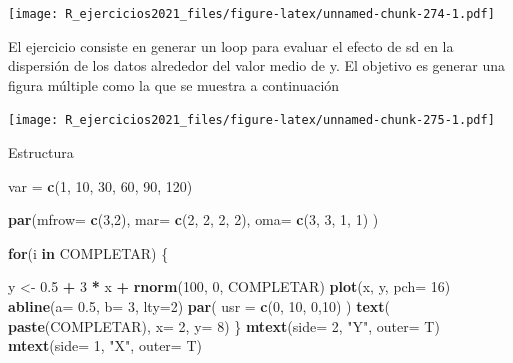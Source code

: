 \documentclass[]{book}
\newenvironment{Shaded}{\begin{snugshade}}{\end{snugshade}}
\newcommand{\ControlFlowTok}[1]{\textcolor[rgb]{0.13,0.29,0.53}{\textbf{#1}}}
\newcommand{\DataTypeTok}[1]{\textcolor[rgb]{0.13,0.29,0.53}{#1}}
\newcommand{\DecValTok}[1]{\textcolor[rgb]{0.00,0.00,0.81}{#1}}
\newcommand{\FloatTok}[1]{\textcolor[rgb]{0.00,0.00,0.81}{#1}}
\newcommand{\KeywordTok}[1]{\textcolor[rgb]{0.13,0.29,0.53}{\textbf{#1}}}
\newcommand{\NormalTok}[1]{#1}
\newcommand{\OperatorTok}[1]{\textcolor[rgb]{0.81,0.36,0.00}{\textbf{#1}}}
\newcommand{\StringTok}[1]{\textcolor[rgb]{0.31,0.60,0.02}{#1}}
\begin{document}
\texttt{[image: R\_ejercicios2021\_files/figure-latex/unnamed-chunk-274-1.pdf]}

El ejercicio consiste en generar un loop para evaluar el efecto de sd en la dispersión de los datos alrededor del valor medio de y. El objetivo es generar una figura múltiple como la que se muestra a continuación

\texttt{[image: R\_ejercicios2021\_files/figure-latex/unnamed-chunk-275-1.pdf]}

Estructura

\begin{Shaded}
\begin{Highlighting}[]
\NormalTok{var =}\StringTok{ }\KeywordTok{c}\NormalTok{(}\DecValTok{1}\NormalTok{, }\DecValTok{10}\NormalTok{, }\DecValTok{30}\NormalTok{, }\DecValTok{60}\NormalTok{, }\DecValTok{90}\NormalTok{, }\DecValTok{120}\NormalTok{)}

\KeywordTok{par}\NormalTok{(}\DataTypeTok{mfrow=} \KeywordTok{c}\NormalTok{(}\DecValTok{3}\NormalTok{,}\DecValTok{2}\NormalTok{), }\DataTypeTok{mar=} \KeywordTok{c}\NormalTok{(}\DecValTok{2}\NormalTok{, }\DecValTok{2}\NormalTok{, }\DecValTok{2}\NormalTok{, }\DecValTok{2}\NormalTok{), }\DataTypeTok{oma=} \KeywordTok{c}\NormalTok{(}\DecValTok{3}\NormalTok{, }\DecValTok{3}\NormalTok{, }\DecValTok{1}\NormalTok{, }\DecValTok{1}\NormalTok{) )}

\ControlFlowTok{for}\NormalTok{(i }\ControlFlowTok{in}\NormalTok{ COMPLETAR) \{}

\NormalTok{  y <-}\StringTok{ }\FloatTok{0.5} \OperatorTok{+}\StringTok{ }\DecValTok{3} \OperatorTok{*}\StringTok{ }\NormalTok{x }\OperatorTok{+}\StringTok{ }\KeywordTok{rnorm}\NormalTok{(}\DecValTok{100}\NormalTok{, }\DecValTok{0}\NormalTok{, COMPLETAR) }
  \KeywordTok{plot}\NormalTok{(x, y, }\DataTypeTok{pch=} \DecValTok{16}\NormalTok{)}
  \KeywordTok{abline}\NormalTok{(}\DataTypeTok{a=} \FloatTok{0.5}\NormalTok{, }\DataTypeTok{b=} \DecValTok{3}\NormalTok{, }\DataTypeTok{lty=}\DecValTok{2}\NormalTok{)}
    \KeywordTok{par}\NormalTok{( }\DataTypeTok{usr =} \KeywordTok{c}\NormalTok{(}\DecValTok{0}\NormalTok{, }\DecValTok{10}\NormalTok{, }\DecValTok{0}\NormalTok{,}\DecValTok{10}\NormalTok{) )}
    \KeywordTok{text}\NormalTok{( }\KeywordTok{paste}\NormalTok{(COMPLETAR), }\DataTypeTok{x=} \DecValTok{2}\NormalTok{, }\DataTypeTok{y=} \DecValTok{8}\NormalTok{)}
\NormalTok{\}}
\KeywordTok{mtext}\NormalTok{(}\DataTypeTok{side=} \DecValTok{2}\NormalTok{, }\StringTok{"Y"}\NormalTok{, }\DataTypeTok{outer=}\NormalTok{ T)}
\KeywordTok{mtext}\NormalTok{(}\DataTypeTok{side=} \DecValTok{1}\NormalTok{, }\StringTok{"X"}\NormalTok{, }\DataTypeTok{outer=}\NormalTok{ T)}
\end{Highlighting}
\end{Shaded}
\end{document}
